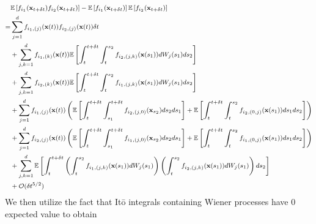 \begin{equation}
\footnotesize
\begin{aligned}
&\mathbb{E} \left[ f_{i_1}(\mathbf{x}_{t + \delta t}) f_{i_2}(\mathbf{x}_{t + \delta t}) \right] 
- \mathbb{E} \left[ f_{i_1}(\mathbf{x}_{t + \delta t}) \right] \mathbb{E} \left[ f_{i_2}(\mathbf{x}_{t + \delta t}) \right] \\
=& 
 \sum_{j=1}^d f_{{i_1},(j)}(\mathbf{x}(t)) f_{{i_2},(j)}(\mathbf{x}(t)) \delta t \\
&+ \sum_{j,k=1}^d f_{{i_1},(k)}(\mathbf{x}(t)) \mathbb{E} \left[  \int_t^{t+\delta t} \int_t^{s_2} f_{{i_2},(j,k)}(\mathbf{x}(s_1)) dW_j(s_1) ds_2 \right] \\
&+  \sum_{j, k=1}^d  f_{{i_2},(k)}(\mathbf{x}(t))\mathbb{E} \left[ \int_t^{t+\delta t} \int_t^{s_2} f_{{i_1},(j,k)}(\mathbf{x}(s_1)) dW_j(s_1) ds_2 \right]\\
&+ \sum_{j=1}^d f_{{i_1},(j)}(\mathbf{x}(t)) \left( \mathbb{E} \left[ \int_t^{t+\delta t} \int_{s_1}^{t+\delta t} f_{{i_2},(j,0)}(\mathbf{x}_{s_2}) ds_2 ds_1 \right] 
+ \mathbb{E} \left[  \int_t^{t+\delta t} \int_t^{s_2} f_{{i_2},(0,j)}(\mathbf{x}(s_1)) ds_1 ds_2\right] \right) \\
&+  \sum_{j=1}^d f_{{i_2},(j)}(\mathbf{x}(t)) \left( \mathbb{E} \left[ \int_t^{t+\delta t} \int_{s_1}^{t + \delta t} f_{{i_1},(j,0)}(\mathbf{x}_{s_2}) ds_2 ds_1 \right]
+ \mathbb{E} \left[ \int_t^{t+\delta t} \int_t^{s_2} f_{{i_1},(0,j)}(\mathbf{x}(s_1)) ds_1 ds_2 \right] \right) \\
&+ \sum_{j, k=1}^d \mathbb{E} \left[ \int_t^{t+\delta t}\left( \int_t^{s_2} f_{{i_1},(j,k)}(\mathbf{x}(s_1)) dW_j(s_1)  \right) \left(  \int_t^{s_2} f_{{i_2},(j,k)}(\mathbf{x}(s_1)) dW_j(s_1) \right) ds_2 \right] \\
&+ \mathcal{O} (\delta t^{5/2})
\end{aligned}
\end{equation}
%
We then utilize the fact that It\={o} integrals containing Wiener processes have 0 expected value to obtain
